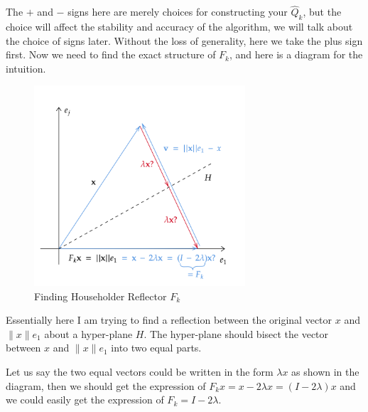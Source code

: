 \noindent The \(+\) and \(-\) signs here are merely choices for constructing your \(\hat{Q}_{k}\), but the choice will affect the stability and accuracy of the algorithm, we will talk about the choice of signs later. Without the loss of generality, here we take the plus sign first. Now we need to find the exact structure of $F_{k}$, and here is a diagram for the intuition. 
\begin{figure}[H]
  \centering
  \includegraphics[width=0.7\textwidth]{./imgs/householder-reflector-initial.png}
  \caption{Finding Householder Reflector $F_k$}
  \label{fig:householder-reflector-initial}
\end{figure}
\noindent Essentially here I am trying to find a reflection between the original vector $x$ and $ \|x\|e_1$ about a hyper-plane $H$. The hyper-plane should bisect the vector between $x$ and $ \|x\|e_1$ into two equal parts. \medskip

\noindent Let us say the two equal vectors could be written in the form $\lambda x$ as shown in the diagram, then we should get the expression of  $F_kx = x - 2\lambda x = (I - 2\lambda)x$ and we could easily get the expression of $F_k = I - 2\lambda$. \medskip

